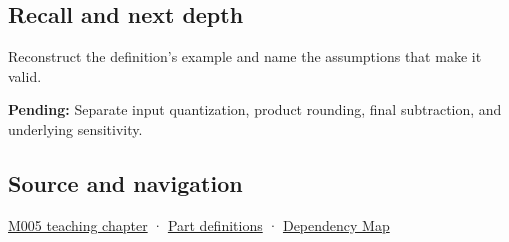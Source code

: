 \subsection{Recall and next depth}\label{appendix-a2773a6a2f9d-recall-and-next-depth}

Reconstruct the definition's example and name the assumptions that make it valid.

\textbf{Pending:} Separate input quantization, product rounding, final subtraction, and underlying sensitivity.

\subsection{Source and navigation}\label{appendix-a2773a6a2f9d-source-and-navigation}

\hyperref[01-foundations-i-ch001-when-arithmetic-meets-uncertainty]{M005 teaching chapter} · \hyperref[appendix-fd090d982a15-m005---parts-77-88]{Part definitions} · \hyperref[appendix-4ad47bdd269a]{Dependency Map}

